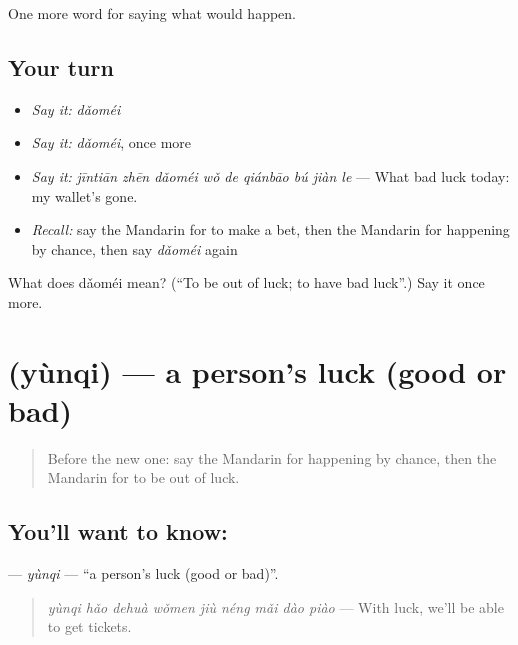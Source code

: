 \begin{grammarlens}[title={What you've built}]
One more word for saying what would happen.
\end{grammarlens}

\subsection*{Your turn}
\begin{itemize}
\raggedright
  \item \emph{Say it:} \emph{dǎoméi}
  \item \emph{Say it:} \emph{dǎoméi}, once more
  \item \emph{Say it:} \emph{jīntiān zhēn dǎoméi wǒ de qiánbāo bú jiàn le} — What bad luck today: my wallet's gone.
  \item \emph{Recall:} say the Mandarin for to make a bet, then the Mandarin for happening by chance, then say \emph{dǎoméi} again
\end{itemize}

\begin{tcolorbox}[breakable,colback=teal!4,colframe=teal!35!black,title={Before you move on}]
What does dǎoméi mean? (\textquotedblleft{}To be out of luck; to have bad luck\textquotedblright{}.) Say it once more.
\end{tcolorbox}
\section[\texorpdfstring{\zh{运气} (yùnqi)}{运气 (yùnqi)}]{ (yùnqi) — a person's luck (good or bad)}

\label{lesson:ZH-C529-yunqi}



\begin{quote}
Before the new one: say the Mandarin for happening by chance, then the Mandarin for to be out of luck.
\end{quote}

\subsection*{You'll want to know: }
\textbf{} — \emph{yùnqi} — \textquotedblleft{}a person's luck (good or bad)\textquotedblright{}.

\begin{quote}
\textbf{} \emph{yùnqi hǎo dehuà wǒmen jiù néng mǎi dào piào} — With luck, we'll be able to get tickets.
\end{quote}


